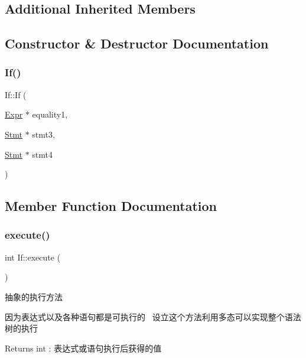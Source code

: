 \subsection*{Additional Inherited Members}


\subsection{Constructor \& Destructor Documentation}
\mbox{\label{class_if_a398387169436db838e9935b985a8f4a9}} 
\subsubsection{\texorpdfstring{If()}{If()}}
{\footnotesize\ttfamily If\+::\+If (\begin{DoxyParamCaption}\item[{\hyperlink{class_expr}{Expr} $\ast$}]{equality1,  }\item[{\hyperlink{class_stmt}{Stmt} $\ast$}]{stmt3,  }\item[{\hyperlink{class_stmt}{Stmt} $\ast$}]{stmt4 }\end{DoxyParamCaption})}



\subsection{Member Function Documentation}
\mbox{\label{class_if_aeadf929258ccd07a239879c118fb152f}} 
\subsubsection{\texorpdfstring{execute()}{execute()}}
{\footnotesize\ttfamily int If\+::execute (\begin{DoxyParamCaption}{ }\end{DoxyParamCaption})\hspace{0.3cm}{\ttfamily [virtual]}}



抽象的执行方法 

因为表达式以及各种语句都是可执行的~\newline
设立这个方法利用多态可以实现整个语法树的执行~\newline
 \begin{DoxyReturn}{Returns}
int \+: 表达式或语句执行后获得的值 
\end{DoxyReturn}


